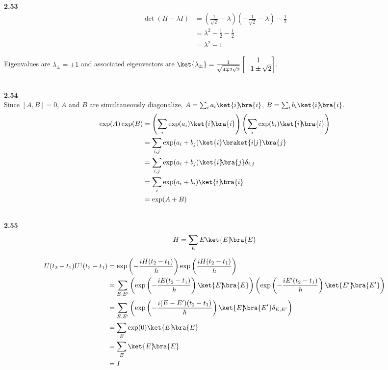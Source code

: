 \documentclass[10pt]{book}
\newcommand{\kb}[1]{\ket{#1}\hspace{-1mm} \bra{#1}} %
\newcommand{\kbt}[2]{\ket{#1}\hspace{-1mm} \bra{#2}} %
\newcommand{\Textbf}[1]{\hspace{3mm}\\ \textbf{#1}\\}
\begin{document}
	
	
	\Textbf{2.53}
	
	\begin{equation}
\begin{aligned}
		\det \left(H - \lambda I\right) &= \left(\frac{1}{\sqrt{2}} - \lambda \right) \left(- \frac{1}{\sqrt{2}} - \lambda \right) - \frac{1}{2}\\
		&= \lambda^2 - \frac{1}{2} - \frac{1}{2}\\
		&= \lambda^2 - 1
	\end{aligned}
\end{equation}
	
	Eigenvalues are $\lambda_\pm = \pm 1$ and associated eigenvectors are $\ket{\lambda_\pm} = \frac{1}{\sqrt{4 \mp 2 \sqrt{2}}} \begin{bmatrix}
		1 \\
		-1 \pm \sqrt{2}
	\end{bmatrix} $.
	
	
	
	
	\Textbf{2.54}
	
	Since $[A, B] = 0$, $A$ and $B$ are simultaneously diagonalize, $A = \sum_i a_i \kb{i}$, $B = \sum_i b_i \kb{i}$.
	\begin{equation}
\begin{aligned}
		\exp (A) \exp (B) &= \left(\sum_i \exp (a_i) \kb{i}\right) \left(\sum_i \exp (b_i) \kb{i}\right) \\
		&= \sum_{i,j} \exp (a_i + b_j) \ket{i} \braket{i | j} \bra{j}\\
		&= \sum_{i,j} \exp (a_i + b_j) \kbt{i}{j} \delta_{i, j}\\
		&= \sum_i \exp (a_i +  b_i) \kb{i}\\
		&= \exp (A+B)
	\end{aligned}
\end{equation}
	
	
	\Textbf{2.55}
	\begin{equation}
\begin{aligned}
		H = \sum_E E \kb{E}
	\end{aligned}
\end{equation}
	
	\begin{equation}
\begin{aligned}
		U(t_2 - t_1) U^\dagger (t_2 - t_1) &= \exp \left( - \frac{iH(t_2 - t_1)}{\hbar} \right)  \exp \left(  \frac{iH(t_2 - t_1)}{\hbar} \right)\\
		&= \sum_{E, E'} \left(\exp \left(- \frac{iE(t_2 - t_1)}{\hbar} \right) \kb{E} \right)
		\left(\exp \left(- \frac{iE'(t_2 - t_1)}{\hbar} \right) \kb{E'} \right)\\
		&= \sum_{E, E'} \left(\exp \left(- \frac{i(E-E')(t_2 - t_1)}{\hbar} \right) \kbt{E}{E'} \delta_{E,E'} \right) \\
		&= \sum_E \exp(0) \kb{E}\\
		&= \sum_E \kb{E}\\
		&= I
	\end{aligned}
\end{equation}
	
\end{document}

